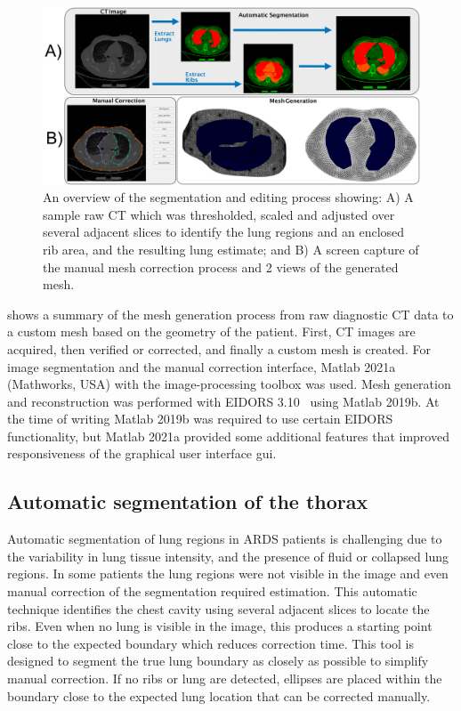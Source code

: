 \begin{figure}
	\centering
	\includegraphics[width=\textwidth]{chapter5-CT_to_mesh/imgs/methods_figure.pdf}
	\caption[Mesh generation method overiew.]{\label{fig:segment_overview}%
	An overview of the segmentation and editing process showing: 
	A) A sample raw CT which was thresholded, scaled and adjusted over several 
	adjacent slices to identify
	the lung regions and an enclosed rib area, and the resulting lung estimate; and
	B) A screen  capture of the manual mesh correction process and 2 views of the generated
	mesh.
	}
\end{figure}

 shows a summary of the mesh generation process from raw diagnostic CT 
data to a custom mesh based on the geometry of the patient.
First, CT images are acquired, then verified or corrected, and finally a custom mesh is created.
For image segmentation and the manual correction interface,
Matlab 2021a (Mathworks, USA) with the 
image-processing toolbox was used.
Mesh generation and reconstruction was performed with 
EIDORS 3.10~\parencite{adler_eidors_2017} using Matlab 2019b.
At the time of writing Matlab 2019b was required to 
use certain EIDORS functionality, but Matlab 2021a provided some additional 
features that improved responsiveness of the 
graphical user interface \acrshort{gui}.

\subsection{Automatic segmentation of the thorax} \label{sec:auto-segment}
Automatic segmentation of lung regions in ARDS patients is challenging due to the variability
in lung tissue intensity, and the presence of fluid or collapsed lung regions. 
In some patients the lung regions were not visible in the image and even manual
correction of the segmentation required estimation. 
This automatic technique identifies the chest cavity using several adjacent slices to
locate the ribs.
Even when no lung is visible in the image, this produces a starting point
close to the expected boundary which reduces correction time. 
This tool is designed to segment the true lung boundary as closely as possible to 
simplify manual correction.
If no ribs or lung are detected, ellipses are placed within the boundary 
close to the expected lung location that 
can be corrected manually.

